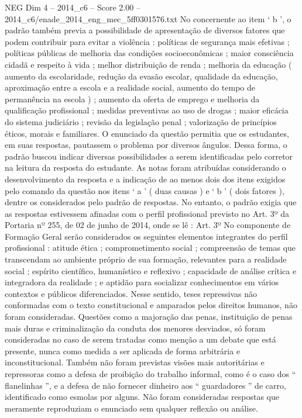 \begin{textsample}{NEG Dim 4 – 2014\_c6 – Score 2.00 – 2014\_c6/enade\_2014\_eng\_mec\_5ff0301576.txt}
No concernente ao item ‘ b ’, o padrão também previa a possibilidade de apresentação de diversos fatores que podem contribuir para evitar a violência : políticas de segurança mais efetivas ; políticas públicas de melhoria das condições socioeconômicas ; maior consciência cidadã e respeito à vida ; melhor distribuição de renda ; melhoria da educação ( aumento da escolaridade, redução da evasão escolar, qualidade da educação, aproximação entre a escola e a realidade social, aumento do tempo de permanência na escola ) ; aumento da oferta de emprego e melhoria da qualificação profissional ; medidas preventivas ao uso de drogas ; maior eficácia do sistema judiciário ; revisão da legislação penal ; valorização de princípios éticos, morais e familiares.
O enunciado da questão permitia que os estudantes, em suas respostas, pautassem o problema por diversos ângulos.
Dessa forma, o padrão buscou indicar diversas possibilidades a serem identificadas pelo corretor na leitura da resposta do estudante.
As notas foram atribuídas considerando o desenvolvimento da resposta e a indicação de ao menos dois dos itens exigidos pelo comando da questão nos itens ‘ a ’ ( duas causas ) e ‘ b ’ ( dois fatores ), dentre os considerados pelo padrão de respostas.
No entanto, o padrão exigia que as respostas estivessem afinadas com o perfil profissional previsto no Art. 3º da Portaria nº 255, de 02 de junho de 2014, onde se lê : Art. 3º No componente de Formação Geral serão considerados os seguintes elementos integrantes do perfil profissional : atitude ética ; comprometimento social ; compreensão de temas que transcendam ao ambiente próprio de sua formação, relevantes para a realidade social ; espírito científico, humanístico e reflexivo ; capacidade de análise crítica e integradora da realidade ; e aptidão para socializar conhecimentos em vários contextos e públicos diferenciados.
Nesse sentido, teses repressivas não conformadas com o texto constitucional e amparados pelos direitos humanos, não foram consideradas.
Questões como a majoração das penas, instituição de penas mais duras e criminalização da conduta dos menores desviados, só foram consideradas no caso de serem tratadas como menção a um debate que está presente, nunca como medida a ser aplicada de forma arbitrária e inconstitucional.
Também não foram previstas visões mais autoritárias e repressoras como a defesa de proibição do trabalho informal, como é o caso dos “ flanelinhas ”, e a defesa de não fornecer dinheiro aos “ guardadores ” de carro, identificado como esmolas por alguns.
Não foram consideradas respostas que meramente reproduziam o enunciado sem qualquer reflexão ou análise.

\end{textsample}
